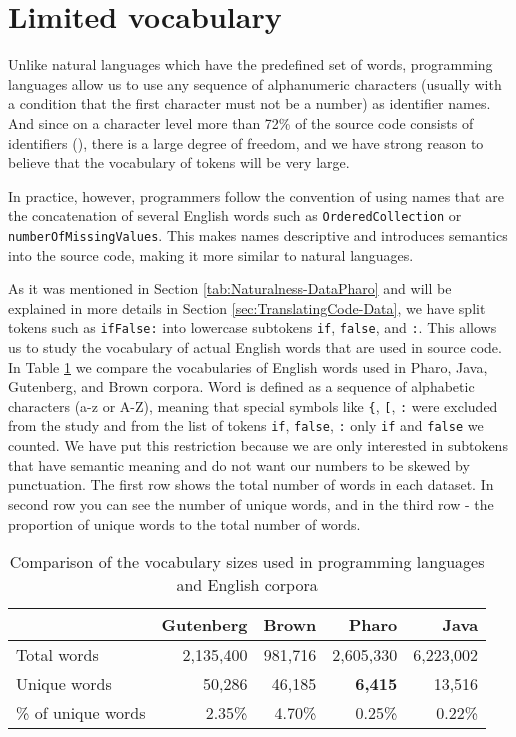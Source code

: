 \section{Limited vocabulary}
\label{sec:Naturalness-Vocabulary}

Unlike natural languages which have the predefined set of words, programming languages allow us to use any sequence of alphanumeric characters (usually with a condition that the first character must not be a number) as identifier names. And since on a character level more than 72\% of the source code consists of identifiers (\cite{Deis06}), there is a large degree of freedom, and we have strong reason to believe that the vocabulary of tokens will be very large.

In practice, however, programmers follow the convention of using names that are the concatenation of several English words such as \texttt{OrderedCollection} or \texttt{numberOfMissingValues}. This makes names descriptive and introduces semantics into the source code, making it more similar to natural languages.

As it was mentioned in Section \ref{tab:Naturalness-DataPharo} and will be explained in more details in Section \ref{sec:TranslatingCode-Data}, we have split tokens such as \texttt{ifFalse:} into lowercase subtokens \texttt{if}, \texttt{false}, and \texttt{:}. This allows us to study the vocabulary of actual English words that are used in source code. In Table \ref{tab:Naturalness-Vocabulary} we compare the vocabularies of English words used in Pharo, Java, Gutenberg, and Brown corpora. Word is defined as a sequence of alphabetic characters (a-z or A-Z), meaning that special symbols like \texttt{\{}, \texttt{[}, \texttt{:} were excluded from the study and from the list of tokens \texttt{if}, \texttt{false}, \texttt{:} only \texttt{if} and \texttt{false} we counted. We have put this restriction because we are only interested in subtokens that have semantic meaning and do not want our numbers to be skewed by punctuation. The first row shows the total number of words in each dataset. In second row you can see the number of unique words, and in the third row - the proportion of unique words to the total number of words.

\begin{table}[H]
\centering
\begin{tabular}{|l|r|r|r|r|}
  \hline
                     & Gutenberg & Brown   & Pharo     & Java \\
  \hline
  Total words        & 2,135,400 & 981,716 & 2,605,330 & 6,223,002 \\
  \hline
  Unique words       & 50,286    & 46,185  & \textbf{6,415}     & 13,516  \\
  \hline
  \% of unique words & 2.35\%    & 4.70\%  & 0.25\%    & 0.22\%  \\
  \hline
\end{tabular}
\caption{Comparison of the vocabulary sizes used in programming languages and English corpora}
\label{tab:Naturalness-Vocabulary}
\end{table}

